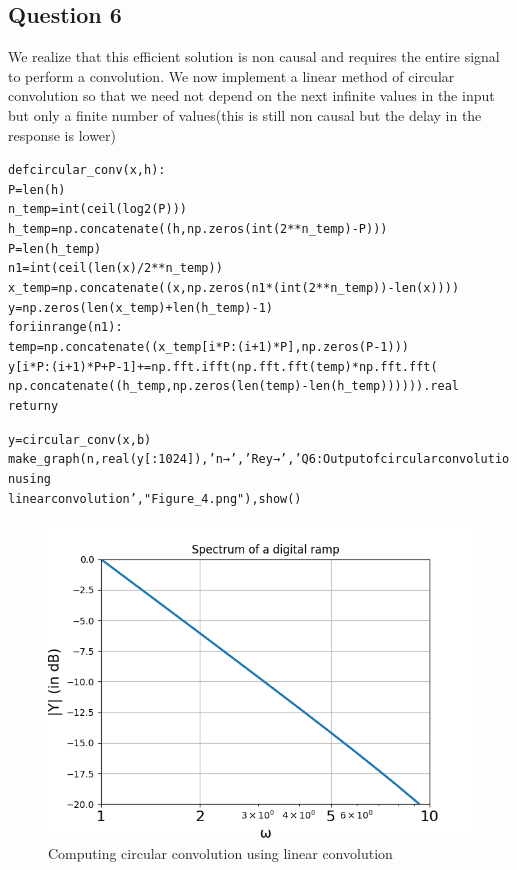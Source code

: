 \documentclass{article}
\begin{document}
\subsection{Question 6}
We realize that this efficient solution is non causal and requires the entire signal to perform a convolution. We now implement a linear method of circular convolution so that we need not depend on the next infinite values in the input but only a finite number of values(this is still non causal but the delay in the response is lower)
\begin{alltt}

def circular_conv(x, h):
    P = len(h)
    n_temp = int(ceil(log2(P)))
    h_temp = np.concatenate((h, np.zeros(int(2**n_temp) - P)))
    P = len(h_temp)
    n1 = int(ceil(len(x)/2**n_temp))
    x_temp = np.concatenate((x, np.zeros(n1*(int(2**n_temp)) - len(x))))
    y = np.zeros(len(x_temp) + len(h_temp) - 1)
    for i in range(n1):
        temp = np.concatenate((x_temp[i*P:(i + 1)*P], np.zeros(P - 1)))
        y[i*P:(i + 1)*P + P - 1] += np.fft.ifft(np.fft.fft(temp) * np.fft.fft( 
        np.concatenate((h_temp,np.zeros(len(temp)-len(h_temp))) ))).real
    return y

y = circular_conv(x, b)
make_graph(n, real(y[:1024]), 'n →', 'Re{y} →', 'Q6: Output of circular convolution using 
linear convolution', "Figure_4.png"), show()

\end{alltt}
\begin{figure}[h!]
\centering
\includegraphics[scale=0.6]{Figure_4.png}
\caption{Computing circular convolution using linear convolution}
\label{fig:universe}
\end{figure}
\end{document}
